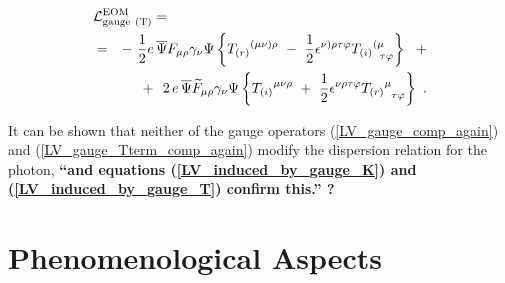 \documentclass[a4paper,12pt]{article}
\begin{document}
\begin{eqnarray}
\nonumber
        \lefteqn{
        \mathcal{L}_{\rm gauge\ (T)}^{\rm EOM} = } \\
\label{LV_induced_by_gauge_T}
	& = &
	-~ \frac{1}{2} e \, \overline{\Psi} F_{\mu\rho} 
	                    \gamma_\nu \Psi 
	\left\{
	{T_{(r)}}^{(\mu\nu)\rho} 
	~-~
	\frac{1}{2} \epsilon^{\nu)\rho\tau\varphi}
	{T_{(i)}}^{(\mu}_{\phantom{\mu}\tau\varphi}
	\right\}
	~~+
	\\
\nonumber
	&&
	+~~
	2\, 
	e\, \overline{\Psi} \widetilde{F}_{\mu\rho}
	        \gamma_\nu \Psi
	\left\{
	   {T_{(i)}}^{\mu\nu\rho} 
	   ~+~
	   \frac{1}{2} \epsilon^{\nu\rho\tau\varphi}
	   {T_{(r)}}^\mu_{\phantom{\mu}\tau\varphi}
	\right\}~.
\end{eqnarray}

	It can be shown 
\cite{GrootNibbelink:2004za}
	that neither of the gauge operators 
	(\ref{LV_gauge_comp_again}) and
	(\ref{LV_gauge_Tterm_comp_again}) 
	modify the dispersion relation for the photon,
	{\bf ``and equations (\ref{LV_induced_by_gauge_K})
	  and (\ref{LV_induced_by_gauge_T}) confirm this.'' ?}


\section{Phenomenological Aspects}
\end{document}
